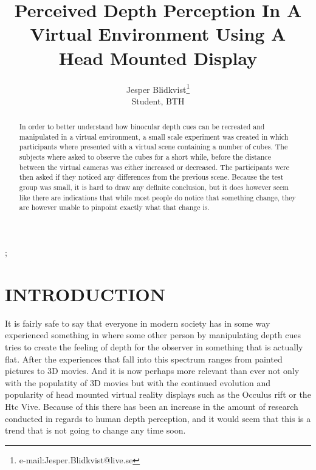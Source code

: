 \documentclass[tog]{acmsiggraph}
\title{Perceived Depth Perception In A Virtual Environment Using A Head Mounted Display}
\author{Jesper Blidkvist\thanks{e-mail:Jesper.Blidkvist@live.se}\\Student, BTH}
\begin{document}


\maketitle

\begin{abstract}
In order to better understand how binocular depth cues can be recreated and manipulated in a virtual environment, a small scale experiment was created in which participants where presented with a virtual scene containing a number of cubes. The subjects where asked to observe the cubes for a short while, before the distance between the virtual cameras was either increased or decreased. The participants were then asked if they noticed any differences from the previous scene. Because the test group was small, it is hard to draw any definite conclusion, but it does however seem like there are indications that while most people do notice that something change, they are however unable to pinpoint exactly what that change is.  



\end{abstract}

\begin{CRcatlist}
  ;
\end{CRcatlist}

\keywordlist


\copyrightspace

\section{INTRODUCTION}
It is fairly safe to say that everyone in modern society has in some way experienced something in where some other person by manipulating depth cues tries to create the feeling of depth for the observer in something that is actually flat. After the experiences that fall into this spectrum ranges from painted pictures to 3D movies. And it is now perhaps more relevant than ever not only with the populatity of 3D movies but with the continued evolution and popularity of head mounted virtual reality displays such as the Occulus rift or the Htc Vive. Because of this there has been an increase in the amount of research conducted in regards to human depth perception, and it would seem that this is a trend that is not going to change any time soon.
\end{document}
